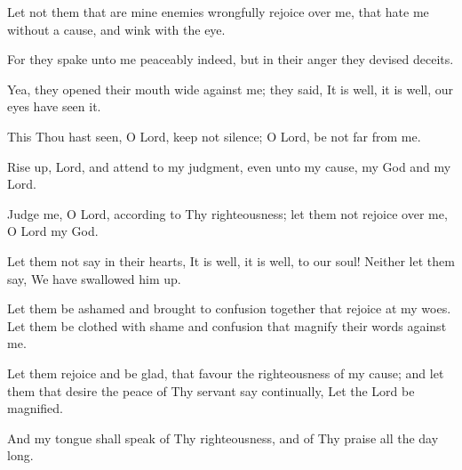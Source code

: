 Let not them that are mine enemies wrongfully rejoice over me, that hate me without a cause, and wink with the eye.

For they spake unto me peaceably indeed, but in their anger they devised deceits.

Yea, they opened their mouth wide against me; they said, It is well, it is well, our eyes have seen it.

This Thou hast seen, O Lord, keep not silence; O Lord, be not far from me.

Rise up, Lord, and attend to my judgment, even unto my cause, my God and my Lord.

Judge me, O Lord, according to Thy righteousness; let them not rejoice over me, O Lord my God.

Let them not say in their hearts, It is well, it is well, to our soul! Neither let them say, We have swallowed him up.

Let them be ashamed and brought to confusion together that rejoice at my woes. Let them be clothed with shame and confusion that magnify their words against me.

Let them rejoice and be glad, that favour the righteousness of my cause; and let them that desire the peace of Thy servant say continually, Let the Lord be magnified.

And my tongue shall speak of Thy righteousness, and of Thy praise all the day long.
